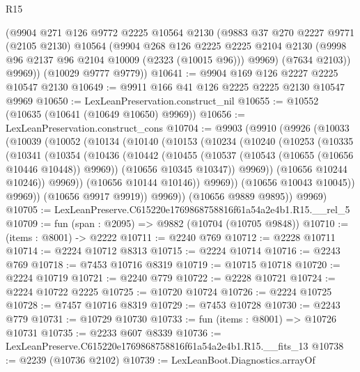\begin{lexlean}{R15}
\begin{coremodule}
        (@9904
          @271
          @126
          @9772
          @2225
          @10564
          @2130
          (@9883
            @37
            @270
            @2227
            @9771
            (@2105 @2130)
            @10564
            (@9904
              @268
              @126
              @2225
              @2225
              @2104
              @2130
              (@9998 @96 @2137 @96 @2104 @10009 (@2323 (@10015 @96)))
              @9969)
            (@7634 @2103))
          @9969))
      (@10029 @9777 @9779))
@10641 := @9904 @169 @126 @2227 @2225 @10547 @2130
@10649 := @9911 @166 @41 @126 @2225 @2225 @2130 @10547 @9969
@10650 := LexLeanPreservation.construct_nil
@10655 := @10552 (@10635 (@10641 (@10649 @10650) @9969))
@10656 := LexLeanPreservation.construct_cons
@10704 := @9903
    (@9910
      (@9926
        (@10033
          (@10039
            (@10052
              (@10134
                (@10140
                  (@10153
                    (@10234
                      (@10240
                        (@10253
                          (@10335
                            (@10341
                              (@10354
                                (@10436
                                  (@10442
                                    (@10455
                                      (@10537 (@10543 (@10655 (@10656 @10446 @10448)) @9969))
                                      (@10656 @10345 @10347))
                                    @9969))
                                (@10656 @10244 @10246))
                              @9969))
                          (@10656 @10144 @10146))
                        @9969))
                    (@10656 @10043 @10045))
                  @9969))
              (@10656 @9917 @9919))
            @9969))
        (@10656 @9889 @9895))
      @9969)
@10705 := LexLeanPreserve.C615220e1769868758816f61a54a2e4b1.R15.__rel_5
@10709 := fun (span : @2095) => @9882 (@10704 (@10705 @9848))
@10710 := (items : @8001) -> @2222
@10711 := @2240 @769
@10712 := @2228 @10711
@10714 := @2224 @10712 @8313
@10715 := @2224 @10714
@10716 := @2243 @769
@10718 := @7453 @10716 @8319
@10719 := @10715 @10718
@10720 := @2224 @10719
@10721 := @2240 @779
@10722 := @2228 @10721
@10724 := @2224 @10722 @2225
@10725 := @10720 @10724
@10726 := @2224 @10725
@10728 := @7457 @10716 @8319
@10729 := @7453 @10728
@10730 := @2243 @779
@10731 := @10729 @10730
@10733 := fun (items : @8001) => @10726 @10731
@10735 := @2233 @607 @8339
@10736 := LexLeanPreserve.C615220e1769868758816f61a54a2e4b1.R15.__fits_13
@10738 := @2239 (@10736 @2102)
@10739 := LexLeanBoot.Diagnostics.arrayOf

\end{coremodule}
\end{lexlean}
